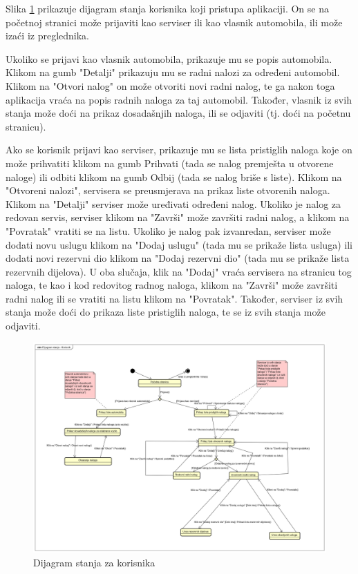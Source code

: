 %			
			
			Slika \ref{fig:statediagram} prikazuje dijagram stanja korisnika koji pristupa aplikaciji. On se na početnoj stranici može prijaviti kao serviser ili kao vlasnik automobila, ili može izaći iz preglednika. 
			
			Ukoliko se prijavi kao vlasnik automobila, prikazuje mu se popis automobila. Klikom na gumb "Detalji" prikazuju mu se radni nalozi za određeni automobil. Klikom na "Otvori nalog" on može otvoriti novi radni nalog, te ga nakon toga aplikacija vraća na popis radnih naloga za taj automobil. Također, vlasnik iz svih stanja može doći na prikaz dosadašnjih naloga, ili se odjaviti (tj. doći na početnu stranicu).
			
			Ako se korisnik prijavi kao serviser, prikazuje mu se lista pristiglih naloga koje on može prihvatiti klikom na gumb Prihvati (tada se nalog premješta u otvorene naloge) ili odbiti klikom na gumb Odbij (tada se nalog briše s liste). Klikom na "Otvoreni nalozi", servisera se preusmjerava na prikaz liste otvorenih naloga. Klikom na "Detalji" serviser može uređivati određeni nalog. Ukoliko je nalog za redovan servis, serviser klikom na "Završi" može završiti radni nalog, a klikom na "Povratak" vratiti se na listu. Ukoliko je nalog pak izvanredan, serviser može dodati novu uslugu klikom na "Dodaj uslugu" (tada mu se prikaže lista usluga) ili dodati novi rezervni dio klikom na "Dodaj rezervni dio" (tada mu se prikaže lista rezervnih dijelova). U oba slučaja, klik na "Dodaj" vraća servisera na stranicu tog naloga, te kao i kod redovitog radnog naloga, klikom na "Završi" može završiti radni nalog ili se vratiti na listu klikom na "Povratak". Također, serviser iz svih stanja može doći do prikaza liste pristiglih naloga, te se iz svih stanja može odjaviti.
			
			\begin{figure}[H]
				\centering
				\includegraphics[width=1.0\linewidth]{dijagrami/state-diagram-edited}
				\caption{Dijagram stanja za korisnika}
				\label{fig:statediagram}
			\end{figure}
		
